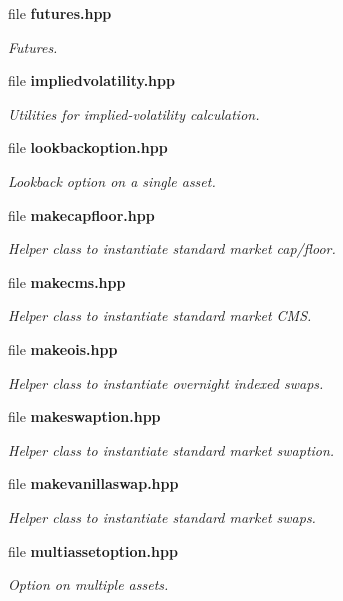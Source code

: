 \begin{DoxyCompactItemize}
file {\bf futures.\+hpp}
\begin{DoxyCompactList}\small\item\em Futures. \end{DoxyCompactList}\item 
file {\bf impliedvolatility.\+hpp}
\begin{DoxyCompactList}\small\item\em Utilities for implied-\/volatility calculation. \end{DoxyCompactList}\item 
file {\bf lookbackoption.\+hpp}
\begin{DoxyCompactList}\small\item\em Lookback option on a single asset. \end{DoxyCompactList}\item 
file {\bf makecapfloor.\+hpp}
\begin{DoxyCompactList}\small\item\em Helper class to instantiate standard market cap/floor. \end{DoxyCompactList}\item 
file {\bf makecms.\+hpp}
\begin{DoxyCompactList}\small\item\em Helper class to instantiate standard market C\+MS. \end{DoxyCompactList}\item 
file {\bf makeois.\+hpp}
\begin{DoxyCompactList}\small\item\em Helper class to instantiate overnight indexed swaps. \end{DoxyCompactList}\item 
file {\bf makeswaption.\+hpp}
\begin{DoxyCompactList}\small\item\em Helper class to instantiate standard market swaption. \end{DoxyCompactList}\item 
file {\bf makevanillaswap.\+hpp}
\begin{DoxyCompactList}\small\item\em Helper class to instantiate standard market swaps. \end{DoxyCompactList}\item 
file {\bf multiassetoption.\+hpp}
\begin{DoxyCompactList}\small\item\em Option on multiple assets. \end{DoxyCompactList}\item 

\end{DoxyCompactItemize}
